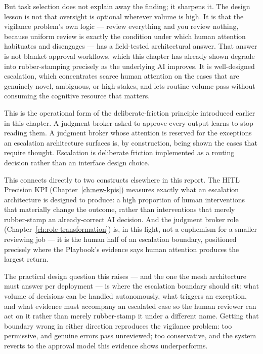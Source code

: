 But task selection does not explain away the finding; it sharpens it. The design lesson is not that oversight is optional wherever volume is high. It is that the vigilance problem's own logic --- review everything and you review nothing, because uniform review is exactly the condition under which human attention habituates and disengages --- has a field-tested architectural answer. That answer is not blanket approval workflows, which this chapter has already shown degrade into rubber-stamping precisely as the underlying AI improves. It is well-designed escalation, which concentrates scarce human attention on the cases that are genuinely novel, ambiguous, or high-stakes, and lets routine volume pass without consuming the cognitive resource that matters.

\begin{keyinsight}[title={Deliberate Friction, Operationalised}]
This is the operational form of the deliberate-friction principle introduced earlier in this chapter. A judgment broker asked to approve every output learns to stop reading them. A judgment broker whose attention is reserved for the exceptions an escalation architecture surfaces is, by construction, being shown the cases that require thought. Escalation is deliberate friction implemented as a routing decision rather than an interface design choice.

This connects directly to two constructs elsewhere in this report. The HITL Precision KPI (Chapter~\ref{ch:new-kpis}) measures exactly what an escalation architecture is designed to produce: a high proportion of human interventions that materially change the outcome, rather than interventions that merely rubber-stamp an already-correct AI decision. And the judgment broker role (Chapter~\ref{ch:role-transformation}) is, in this light, not a euphemism for a smaller reviewing job --- it is the human half of an escalation boundary, positioned precisely where the Playbook's evidence says human attention produces the largest return.
\end{keyinsight}

The practical design question this raises --- and the one the mesh architecture must answer per deployment --- is where the escalation boundary should sit: what volume of decisions can be handled autonomously, what triggers an exception, and what evidence must accompany an escalated case so the human reviewer can act on it rather than merely rubber-stamp it under a different name. Getting that boundary wrong in either direction reproduces the vigilance problem: too permissive, and genuine errors pass unreviewed; too conservative, and the system reverts to the approval model this evidence shows underperforms.

